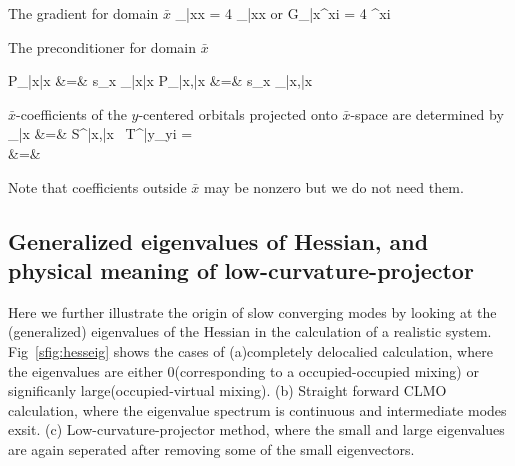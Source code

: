 \documentclass[aps,prl,twocolumn,reprint,amsmath,amssymb]{revtex4-1}
\begin{document}
The gradient for domain $\bar{x}$
%
\bea
{}_{\bar{x}x} = 4 _{\bar{x}x}
\eea
%
or
%
\bea
{G_{\bar{x}\mu}}^{xi} = 4 ^{xi}
\eea
%

The preconditioner for domain $\bar{x}$ 

%
\small {
\bea
P_{\bar{x}\bar{x}} &=& s_x _{\bar{x}\bar{x}} 
\eea 
%
\bea
P_{\bar{x}\mu,\bar{x}\nu} &=& s_x _{\bar{x}\mu,\bar{x}\nu} 
\eea 

$\bar{x}$-coefficients of the $y$-centered orbitals projected onto $\bar{x}$-space are determined by
%
\bea
{}_{\bar{x}}   &=&  S^{\bar{x}\mu,\bar{x}\nu} \, {T^{\bar{y}\lambda}}_{yi} = \nonumber \\
 &=&  
\eea 
}
%
Note that coefficients outside $\bar{x}$ may be nonzero but we do not need them.

\subsection{Generalized eigenvalues of Hessian, and physical meaning of low-curvature-projector}

Here we further illustrate the origin of slow converging modes by looking at the (generalized) eigenvalues of the Hessian in the calculation of a realistic system. Fig~\ref{sfig:hesseig} shows the cases of (a)completely delocalied calculation, where the eigenvalues are either 0(corresponding to a occupied-occupied mixing) or significanly large(occupied-virtual mixing). (b) Straight forward CLMO calculation, where the eigenvalue spectrum is continuous and intermediate modes exsit. (c) Low-curvature-projector method, where the small and large eigenvalues are again seperated after removing some of the small eigenvectors.
\end{document}
